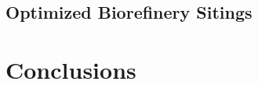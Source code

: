 \documentclass[preprint,12pt]{elsarticle}
\begin{document}
\subsection{Optimized Biorefinery Sitings}
\label{sec:gbsm-out}

\section{Conclusions}
\label{sec:conclude}





 






\end{document}
